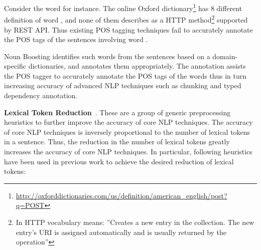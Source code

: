 Consider the word  for instance. 
The online Oxford dictionary\footnote{\url{http://oxforddictionaries.com/us/definition/american_english/post?q=POST}} has 8 different definition of word , and none of them describes  as a HTTP method\footnote{In HTTP vocabulary  means: ''Creates a new entry in the collection.
The new entry's URI is assigned automatically and is usually returned by the operation''}
supported by REST API.
Thus existing POS tagging techniques fail to accurately annotate the POS tags of the sentences involving word .  

Noun Boosting identifies such words from the sentences based on a domain-specific dictionaries, and annotates them appropriately.
The annotation assists the POS tagger to accurately annotate the POS tags of the words thus in turn increasing accuracy of advanced NLP techniques such as chunking and typed dependency annotation.

\textbf{Lexical Token Reduction}~\cite{pandita13:WHYPER}.
These are a group of generic preprocessing heuristics to further improve the accuracy of core NLP techniques.
The accuracy of core NLP techniques is inversely proportional to the number of lexical tokens in a sentence.
Thus, the reduction in the number of lexical tokens greatly increases the accuracy of core NLP techniques. 
In particular, following heuristics have been used in previous work to achieve the desired reduction of lexical tokens:

